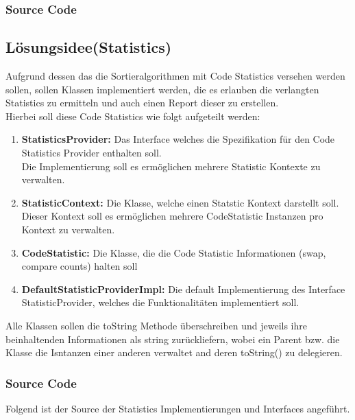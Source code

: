\documentclass[11pt, a4paper, twoside]{article}   	%
\newcommand{\srcDir}{../src/main/java}
\newcommand{\mainPackage}{\srcDir/at/fhooe/swe4/lab3}
\newcommand{\ideaSection}{Lösungsidee}
\begin{document}
\subsubsection{Source Code}

\newpage
\subsection{\ideaSection \hspace{2mm}(Statistics)}
Aufgrund dessen das die Sortieralgorithmen mit Code Statistics versehen werden sollen, sollen Klassen implementiert werden, die es erlauben die verlangten Statistics zu ermitteln und auch einen Report dieser zu erstellen.\\
Hierbei soll diese Code Statistics wie folgt aufgeteilt werden:
\begin{enumerate}
	\item \textbf{StatisticsProvider:} Das Interface welches die Spezifikation für den Code Statistics Provider enthalten soll.\\
	Die Implementierung soll es ermöglichen mehrere Statistic Kontexte zu verwalten.
	\item \textbf{StatisticContext:} Die Klasse, welche einen Statstic Kontext darstellt soll.\\
	Dieser Kontext soll es ermöglichen mehrere CodeStatistic Instanzen pro Kontext zu verwalten.
	\item \textbf{CodeStatistic:} Die Klasse, die die Code Statistic Informationen (swap, compare counts) halten soll
	\item \textbf{DefaultStatisticProviderImpl:} Die default Implementierung des Interface StatisticProvider, welches die Funktionalitäten implementiert soll.
\end{enumerate}
Alle Klassen sollen die toString Methode überschreiben und jeweils ihre beinhaltenden Informationen als string zurückliefern, wobei ein Parent bzw. die Klasse die Isntanzen einer anderen verwaltet and deren toString() zu delegieren.
\newpage
\subsubsection{Source Code}
Folgend ist der Source der Statistics Implementierungen und Interfaces angeführt.




\end{document}
